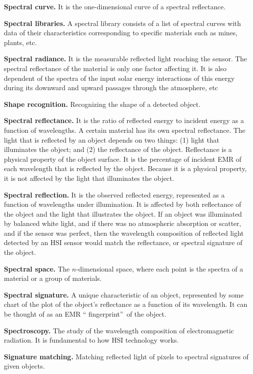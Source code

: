 \textbf{Spectral curve.} It is the one-dimensional curve of a spectral reflectance.

\textbf{Spectral libraries.} A spectral library consists of a list of spectral
curves with data of their characteristics corresponding to specific materials
such as mines, plants, etc.

\textbf{Spectral radiance.} It is the measurable reflected light reaching the
sensor. The spectral reflectance of the material is only one factor affecting
it. It is also dependent of the spectra of the input solar energy interactions
of this energy during its downward and upward passages through the atmosphere, etc

\textbf{Shape recognition.} Recognizing the shape of a detected object.

\textbf{Spectral reflectance.} It is the ratio of reflected energy to incident
energy as a function of wavelengths. A certain material has its own spectral
reflectance. The light that is reflected by an object depends on two things:
(1) light that illuminates the object; and (2) the reflectance of the object.
Reflectance is a physical property of the object surface. It is the percentage
of incident EMR of each wavelength that is reflected by the object. Because it
is a physical property, it is not affected by the light that illuminates the object.

\textbf{Spectral reflection.} It is the observed reflected energy, represented
as a function of wavelengths under illumination. It is affected by both
reflectance of the object and the light that illustrates the object. If an
object was illuminated by balanced white light, and if there was no
atmospheric absorption or scatter, and if the sensor was perfect, then the
wavelength composition of reflected light detected by an HSI sensor would
match the reflectance, or spectral signature of the object.

\textbf{Spectral space.} The $n$-dimensional space, where each point is the
spectra of a material or a group of materials.

\textbf{Spectral signature.} A unique characteristic of an object, represented
by some chart of the plot of the object's reflectance as a function of its
wavelength. It can be thought of as an EMR \textquotedblleft
fingerprint\textquotedblright\ of the object.

\textbf{Spectroscopy.} The study of the wavelength composition of
electromagnetic radiation. It is fundamental to how HSI technology works.

\textbf{Signature matching.} Matching reflected light of pixels to spectral
signatures of given objects.

\endinput

